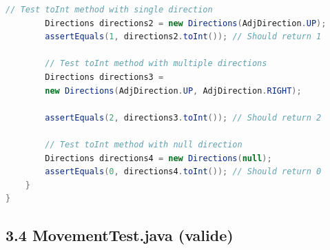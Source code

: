 \documentclass[a4paper,11pt]{article}
\begin{document}
\begin{lstlisting}[language=Java]
        // Test toInt method with single direction
        Directions directions2 = new Directions(AdjDirection.UP);
        assertEquals(1, directions2.toInt()); // Should return 1

        // Test toInt method with multiple directions
        Directions directions3 = 
        new Directions(AdjDirection.UP, AdjDirection.RIGHT);
        
        assertEquals(2, directions3.toInt()); // Should return 2

        // Test toInt method with null direction
        Directions directions4 = new Directions(null);
        assertEquals(0, directions4.toInt()); // Should return 0
    }
}


\end{lstlisting}

\newpage
\subsection{3.4 MovementTest.java (valide)}
\end{document}
